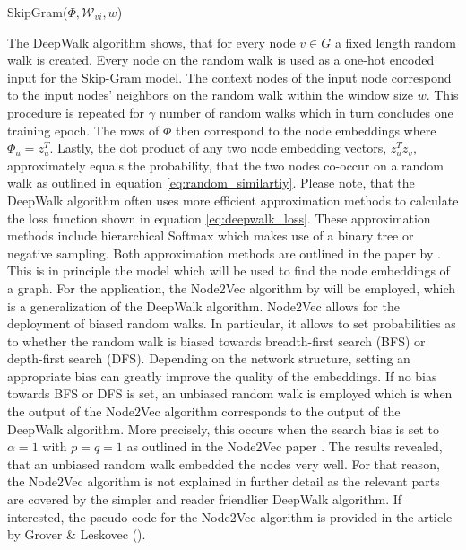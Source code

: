 	\begin{algorithm}[h]
		\scriptsize
		\SetAlgoLined
		\nl {}
		\caption[SkipGram]{SkipGram($\Phi,\mathcal{W}_{vi},w$)}
		\label{algo:SkipGram}
	\end{algorithm}
	
	\vspace{5mm}
	
	\noindent The DeepWalk algorithm shows, that for every node $v\in G$ a
	fixed length random walk is created. Every node on the random walk is used
	as a one-hot encoded input for the Skip-Gram model. The context nodes of the
	input node correspond to the input nodes' neighbors on the random walk 
	within the window size $w$. This procedure is repeated for $\gamma$ 
	number of random walks which in turn concludes one training epoch. The rows
	of $\Phi$ then correspond to the node embeddings where
	$\Phi_{u}=z_{u}^{T}$. Lastly, the dot product of any two node embedding
	vectors, $z_{u}^{T}z_{v}$, approximately equals the probability, that the
	two nodes co-occur on a random walk as outlined in equation 
	\ref{eq:random_similartiy}. Please note, that the DeepWalk algorithm often 
	uses more efficient approximation methods to calculate the loss function
	shown in equation \ref{eq:deepwalk_loss}. These approximation methods
	include hierarchical Softmax which makes use of a binary tree or negative 
	sampling. Both approximation methods are outlined in the paper by 
	\cite{mikolov2013distributed}. \\

	\noindent This is in principle the model which will be used to find the node
	embeddings of a graph. For the application, the Node2Vec algorithm by
	\cite{grover2016node2vec} will be employed, which is a generalization of 
	the DeepWalk algorithm. Node2Vec allows for the deployment of biased random 
	walks. In particular, it allows to set probabilities as to whether the 
	random walk is biased towards breadth-first search (BFS) or depth-first 
	search (DFS). Depending on the network structure, setting an appropriate 
	bias can greatly improve the quality of the embeddings. If no bias towards 
	BFS or DFS is set, an unbiased random walk is employed which is when
	the output of the Node2Vec algorithm corresponds to the output of the 
	DeepWalk algorithm. More precisely, this occurs when the search bias is set
	to $\alpha = 1$ with $p=q=1$ as outlined in the Node2Vec paper 
	\citep[p. 860]{grover2016node2vec}. The results revealed, that an unbiased 
	random walk embedded the nodes very well. For that reason, the Node2Vec 
	algorithm is not explained in further detail as the relevant parts are 
	covered by the simpler and reader friendlier DeepWalk algorithm. If
	interested, the pseudo-code for the Node2Vec algorithm is provided in the 
	article by Grover \& Leskovec (\citeyear[p. 859]{grover2016node2vec}). \\

